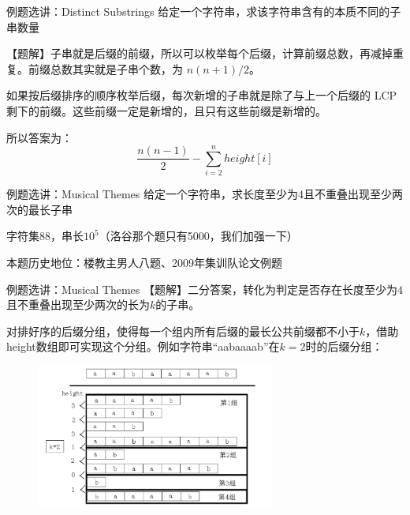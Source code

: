 \documentclass{beamer}
\begin{document}
\begin{frame}[fragile]{例题选讲：Distinct Substrings}
\small
给定一个字符串，求该字符串含有的本质不同的子串数量

\vspace{1em}\pause
【题解】子串就是后缀的前缀，所以可以枚举每个后缀，计算前缀总数，再减掉重复。前缀总数其实就是子串个数，为 $n(n+1)/2$。

\vspace{1em}\pause
如果按后缀排序的顺序枚举后缀，每次新增的子串就是除了与上一个后缀的 LCP 剩下的前缀。这些前缀一定是新增的，且只有这些前缀是新增的。

\vspace{1em}\pause
所以答案为：
\begin{equation*}
    \frac{n(n-1)}{2}-\sum_{i=2}^n height[i]
\end{equation*}
\end{frame}

\begin{frame}[fragile]{例题选讲：Musical Themes}
\small
给定一个字符串，求长度至少为$4$且不重叠出现至少两次的最长子串
\vspace{1em}

字符集88，串长$10^5$（洛谷那个题只有5000，我们加强一下）

\vspace{1em}
本题历史地位：楼教主男人八题、2009年集训队论文例题
\end{frame}

\begin{frame}[fragile]{例题选讲：Musical Themes}
\small
【题解】二分答案，转化为判定是否存在长度至少为$4$且不重叠出现至少两次的长为$k$的子串。

\vspace{1em}\pause
对排好序的后缀分组，使得每一个组内所有后缀的最长公共前缀都不小于$k$，借助height数组即可实现这个分组。例如字符串“aabaaaab”在$k=2$时的后缀分组：
\begin{figure}[H]
    \centering
    \includegraphics[width=0.7\textwidth]{pic/sa3.png}
\end{figure}
\end{frame}
\end{document}
